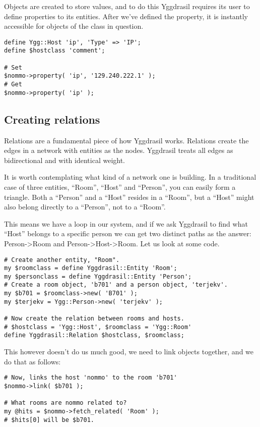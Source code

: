 \documentclass[english,a4paper]{article}
\begin{document}
Objects are created to store values, and to do this Yggdrasil requires
its user to define properties to its entities.  After we've defined
the property, it is instantly accessible for objects of the class in
question.

\lstset{caption=Defining properties,label=properties}
\begin{lstlisting}
define Ygg::Host 'ip', 'Type' => 'IP';
define $hostclass 'comment';

# Set
$nommo->property( 'ip', '129.240.222.1' );
# Get
$nommo->property( 'ip' );
\end{lstlisting}

\subsection{Creating relations}

Relations are a fundamental piece of how Yggdrasil works.  Relations
create the edges in a network with entities as the nodes.  Yggdrasil
treats all edges as bidirectional and with identical weight.  

It is worth contemplating what kind of a network one is building.  In
a traditional case of three entities, ``Room'', ``Host'' and
``Person'', you can easily form a triangle.  Both a ``Person'' and a
``Host'' resides in a ``Room'', but a ``Host'' might also belong
directly to a ``Person'', not to a ``Room''.

This means we have a loop in our system, and if we ask Yggdrasil to
find what ``Host'' belongs to a specific person we can get two
distinct paths as the answer: Person->Room and Person->Host->Room.
Let us look at some code.

\lstset{caption=Defining relations,label=relations}
\begin{lstlisting}
# Create another entity, "Room".
my $roomclass = define Yggdrasil::Entity 'Room';
my $personclass = define Yggdrasil::Entity 'Person';
# Create a room object, 'b701' and a person object, 'terjekv'.
my $b701 = $roomclass->new( 'B701' );
my $terjekv = Ygg::Person->new( 'terjekv' );

# Now create the relation between rooms and hosts.
# $hostclass = 'Ygg::Host', $roomclass = 'Ygg::Room'
define Yggdrasil::Relation $hostclass, $roomclass;
\end{lstlisting}

This however doesn't do us much good, we need to link objects
together, and we do that as follows:

\lstset{caption=Linking ``nommo'' to ``b701'',label=linking}
\begin{lstlisting}
# Now, links the host 'nommo' to the room 'b701'
$nommo->link( $b701 );

# What rooms are nommo related to?
my @hits = $nommo->fetch_related( 'Room' );
# $hits[0] will be $b701.
\end{lstlisting}
\end{document}

